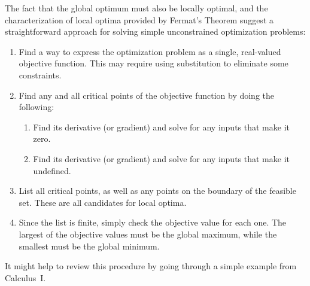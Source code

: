 \documentclass[11pt]{article}
\theoremstyle{definition} %
\begin{document}
The fact that the global optimum must also be locally optimal, and the characterization of local optima provided by Fermat's Theorem suggest a straightforward approach for solving simple unconstrained optimization problems:
\begin{enumerate}
	\item Find a way to express the optimization problem as a single, real-valued objective function. This may require using substitution to eliminate some constraints.
	\item Find any and all critical points of the objective function by doing the following:
	\begin{enumerate}
		\item Find its derivative (or gradient) and solve for any inputs that make it zero.
		\item Find its derivative (or gradient) and solve for any inputs that make it undefined. 
	\end{enumerate}
	\item List all critical points, as well as any points on the boundary of the feasible set. These are all candidates for local optima.
	\item Since the list is finite, simply check the objective value for each one. The largest of the objective values must be the global maximum, while the smallest must be the global minimum.
\end{enumerate}

It might help to review this procedure by going through a simple example from Calculus~I.
\end{document}
